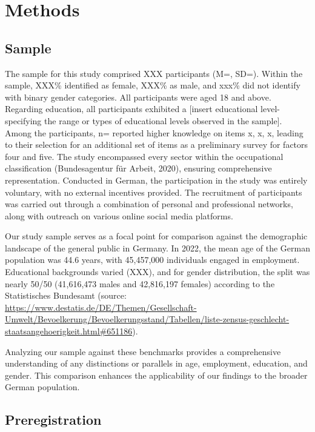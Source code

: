 \documentclass[
  12pt,
  a4paper,
  twoside]{article}
\begin{document}
\hypertarget{methods}{%
\section{Methods}\label{methods}}

\hypertarget{sample}{%
\subsection{Sample}\label{sample}}

The sample for this study comprised XXX participants (M=, SD=). Within the sample, XXX\% identified as female, XXX\% as male, and xxx\% did not identify with binary gender categories. All participants were aged 18 and above. Regarding education, all participants exhibited a {[}insert educational level- specifying the range or types of educational levels observed in the sample{]}. Among the participants, n= reported higher knowledge on items x, x, x, leading to their selection for an additional set of items as a preliminary survey for factors four and five.
The study encompassed every sector within the occupational classification (Bundesagentur für Arbeit, 2020), ensuring comprehensive representation. Conducted in German, the participation in the study was entirely voluntary, with no external incentives provided. The recruitment of participants was carried out through a combination of personal and professional networks, along with outreach on various online social media platforms.

Our study sample serves as a focal point for comparison against the demographic landscape of the general public in Germany. In 2022, the mean age of the German population was 44.6 years, with 45,457,000 individuals engaged in employment. Educational backgrounds varied (XXX), and for gender distribution, the split was nearly 50/50 (41,616,473 males and 42,816,197 females) according to the Statistisches Bundesamt (source: \url{https://www.destatis.de/DE/Themen/Gesellschaft-Umwelt/Bevoelkerung/Bevoelkerungsstand/Tabellen/liste-zensus-geschlecht-staatsangehoerigkeit.html\#651186}).

Analyzing our sample against these benchmarks provides a comprehensive understanding of any distinctions or parallels in age, employment, education, and gender. This comparison enhances the applicability of our findings to the broader German population.

\hypertarget{preregistration}{%
\subsection{Preregistration}\label{preregistration}}
\end{document}
